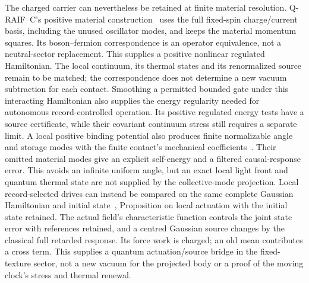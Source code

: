 \documentclass[12pt,a4paper]{article}
\begin{document}
The charged carrier can nevertheless be retained at finite material
resolution. Q-RAIF~C's positive material construction~\cite{QRC}
uses the full fixed-spin charge/current basis, including the unused
oscillator modes, and keeps the material momentum squares. Its
boson--fermion correspondence is an operator equivalence, not a
neutral-sector replacement. This supplies a positive nonlinear
regulated Hamiltonian. The local continuum, its thermal states and
its renormalized source remain to be matched; the correspondence
does not determine a new vacuum subtraction for each contact.
Smoothing a permitted bounded gate under this interacting Hamiltonian
also supplies the energy regularity needed for autonomous
record-controlled operation. Its positive regulated energy tests
have a source certificate, while their covariant continuum stress
still requires a separate limit.
A local positive binding potential also produces finite normalizable
angle and storage modes with the finite contact's mechanical
coefficients~\cite{QRC}. Their omitted material modes give an explicit
self-energy and a filtered causal-response error. This avoids an
infinite uniform angle, but an exact local light front and quantum
thermal state are not supplied by the collective-mode projection.
Local record-selected drives can instead be compared on the same
complete Gaussian Hamiltonian and initial state~\cite{QRC},
Proposition on local actuation with the initial state retained.
The actual field's characteristic function controls the joint state
error with references retained, and a centred Gaussian source changes
by the classical full retarded response. Its force work is charged;
an old mean contributes a cross term. This supplies a quantum
actuation/source bridge in the fixed-texture sector, not a new vacuum
for the projected body or a proof of the moving clock's stress and
thermal renewal.
\end{document}
